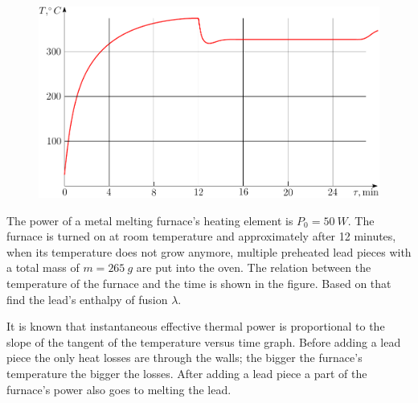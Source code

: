 \begin{figure}%
\includegraphics[width=\linewidth]{2012-v3g-07-ahi_graafik}%
\end{figure}
The power of a metal melting furnace’s heating element is $P_0 = \SI{50}{W}$. The furnace is turned on at room temperature and approximately after 12 minutes, when its temperature does not grow anymore, multiple preheated lead pieces with a total mass of $m = \SI{265}{g}$ are put into the oven. The relation between the temperature of the furnace and the time is shown in the figure. Based on that find the lead’s enthalpy of fusion $\lambda$.

\hinteng
It is known that instantaneous effective thermal power is proportional to the slope of the tangent of the temperature versus time graph. Before adding a lead piece the only heat losses are through the walls; the bigger the furnace’s temperature the bigger the losses. After adding a lead piece a part of the furnace’s power also goes to melting the lead.

